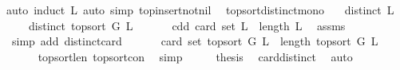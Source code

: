 \begin{isabellebody}
%
\isatagproof
{}\isamarkupfalse%
{\isacharparenleft}{\kern0pt}auto{\isacharcomma}{\kern0pt}\ induct\ L{\isacharcomma}{\kern0pt}\ auto\ simp{\isacharcolon}{\kern0pt}\ top{\isacharunderscore}{\kern0pt}insert{\isacharunderscore}{\kern0pt}not{\isacharunderscore}{\kern0pt}nil{\isacharparenright}{\kern0pt}\ \isamarkupfalse%
%
\endisatagproof
{\isafoldproof}%
%
\isadelimproof
\isanewline
%
\endisadelimproof
\isanewline
\isanewline
\isanewline
{}\isamarkupfalse%
\ top{\isacharunderscore}{\kern0pt}sort{\isacharunderscore}{\kern0pt}distinct{\isacharunderscore}{\kern0pt}mono{\isacharcolon}{\kern0pt}\isanewline
\ \ \ {\isachardoublequoteopen}distinct\ L{\isachardoublequoteclose}\isanewline
\ \ \ \ {\isachardoublequoteopen}distinct\ {\isacharparenleft}{\kern0pt}top{\isacharunderscore}{\kern0pt}sort\ G\ L{\isacharparenright}{\kern0pt}{\isachardoublequoteclose}\ \isanewline
%
\isadelimproof
%
\endisadelimproof
%
\isatagproof
{}\isamarkupfalse%
\ {\isacharminus}{\kern0pt}\isanewline
\ \ \isamarkupfalse%
\ cdd{\isacharcolon}{\kern0pt}\ {\isachardoublequoteopen}card\ {\isacharparenleft}{\kern0pt}set\ L{\isacharparenright}{\kern0pt}\ {\isacharequal}{\kern0pt}\ length\ L{\isachardoublequoteclose}\ \isamarkupfalse%
\ assms\isanewline
\ \ \ \ \isamarkupfalse%
\ {\isacharparenleft}{\kern0pt}simp\ add{\isacharcolon}{\kern0pt}\ distinct{\isacharunderscore}{\kern0pt}card{\isacharparenright}{\kern0pt}\ \isanewline
\ \ \isamarkupfalse%
\ \isamarkupfalse%
\ {\isachardoublequoteopen}card\ {\isacharparenleft}{\kern0pt}set\ {\isacharparenleft}{\kern0pt}top{\isacharunderscore}{\kern0pt}sort\ G\ L{\isacharparenright}{\kern0pt}{\isacharparenright}{\kern0pt}\ {\isacharequal}{\kern0pt}\ length\ {\isacharparenleft}{\kern0pt}top{\isacharunderscore}{\kern0pt}sort\ G\ L{\isacharparenright}{\kern0pt}{\isachardoublequoteclose}\ \isanewline
\ \ \ \ \isamarkupfalse%
\ top{\isacharunderscore}{\kern0pt}sort{\isacharunderscore}{\kern0pt}len\ top{\isacharunderscore}{\kern0pt}sort{\isacharunderscore}{\kern0pt}con\ \isamarkupfalse%
\ simp\isanewline
\ \ \isamarkupfalse%
\ \isamarkupfalse%
\ {\isacharquery}{\kern0pt}thesis\ \isamarkupfalse%
\ card{\isacharunderscore}{\kern0pt}distinct\ \isamarkupfalse%
\ auto\isanewline
{}\isamarkupfalse%
%
\endisatagproof
{\isafoldproof}%
%
\isadelimproof
\isanewline
%
\endisadelimproof

\end{isabellebody}
